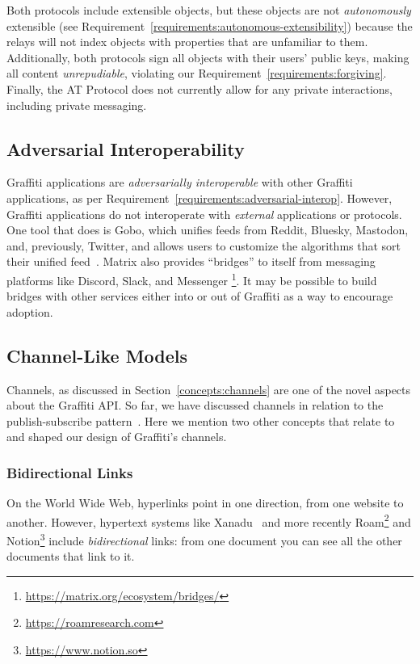 Both protocols include extensible objects, but these objects are not
\emph{autonomously} extensible (see Requirement~\ref{requirements:autonomous-extensibility})
because the relays will not index objects with properties that are unfamiliar to them.
Additionally, both protocols sign all objects with their users' public keys, making
all content \emph{unrepudiable}, violating our Requirement~\ref{requirements:forgiving}.
Finally, the AT Protocol does not currently allow for
any private interactions, including private messaging.

\subsection{Adversarial Interoperability}

Graffiti applications are \emph{adversarially interoperable} with other Graffiti
applications, as per Requirement~\ref{requirements:adversarial-interop}.
However, Graffiti applications do not interoperate with \emph{external}
applications or protocols.
One tool that does is Gobo, which unifies feeds from Reddit, Bluesky,
Mastodon, and, previously, Twitter,
and allows users to customize the algorithms that sort their unified feed~\cite{gobo}.
Matrix also provides ``bridges'' to itself from messaging platforms like
Discord, Slack, and Messenger
\footnote{
    \url{https://matrix.org/ecosystem/bridges/}
}.
It may be possible to build bridges with other services either into or out of
Graffiti as a way to encourage adoption.

\subsection{Channel-Like Models}

Channels, as discussed in Section~\ref{concepts:channels}
are one of the novel aspects about the Graffiti API.
So far, we have discussed channels in relation to the publish-subscribe
pattern~\cite{pubsub}.
Here we mention two other concepts that relate to and shaped our
design of Graffiti's channels.

\subsubsection{Bidirectional Links}

On the World Wide Web, hyperlinks point in one direction, from one website to another.
However, hypertext systems like Xanadu~\cite{xanadu}
and more recently Roam\footnote{\url{https://roamresearch.com}}
and Notion\footnote{\url{https://www.notion.so}}
include \emph{bidirectional} links:
from one document you can see all the other documents that link to it.

